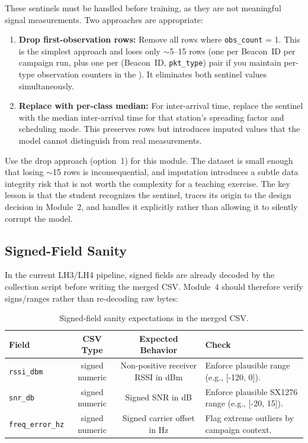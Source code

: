 \documentclass[11pt,letterpaper]{article}
\begin{document}
	These sentinels must be handled before training, as they are not meaningful signal measurements. Two approaches are appropriate:

	\begin{enumerate}[leftmargin=2em]
		\item \textbf{Drop first-observation rows:} Remove all rows where \texttt{obs\_count} = 1. This is the simplest approach and loses only $\sim$5--15 rows (one per Beacon~ID per campaign run, plus one per (Beacon~ID, \texttt{pkt\_type}) pair if you maintain per-type observation counters in the \FPGA{}). It eliminates both sentinel values simultaneously.
		\item \textbf{Replace with per-class median:} For inter-arrival time, replace the sentinel with the median inter-arrival time for that station's spreading factor and scheduling mode. This preserves rows but introduces imputed values that the model cannot distinguish from real measurements.
	\end{enumerate}

	\begin{tcolorbox}[infobox={Recommendation}]
		Use the drop approach (option~1) for this module. The dataset is small enough that losing $\sim$15 rows is inconsequential, and imputation introduces a subtle data integrity risk that is not worth the complexity for a teaching exercise. The key lesson is that the student recognizes the sentinel, traces its origin to the \FPGA{} design decision in Module~2, and handles it explicitly rather than allowing it to silently corrupt the model.
	\end{tcolorbox}

	\subsection{Signed-Field Sanity}

	In the current LH3/LH4 pipeline, signed fields are already decoded by the collection script before writing the merged CSV. Module~4 should therefore verify signs/ranges rather than re-decoding raw bytes:

	\begin{table}[ht!]
		\centering
		\caption{Signed-field sanity expectations in the merged CSV.}
		\label{tab:signed}
		\renewcommand{\arraystretch}{1.3}
		\begin{tabularx}{\textwidth}{l c c X}
			\toprule
			\textbf{Field} & \textbf{CSV Type} & \textbf{Expected Behavior} & \textbf{Check} \\
			\midrule
			\texttt{rssi\_dbm} & signed numeric & Non-positive receiver RSSI in dBm & Enforce plausible range (e.g., [-120, 0]). \\
			\texttt{snr\_db} & signed numeric & Signed SNR in dB & Enforce plausible SX1276 range (e.g., [-20, 15]). \\
			\texttt{freq\_error\_hz} & signed numeric & Signed carrier offset in Hz & Flag extreme outliers by campaign context. \\
			\bottomrule
		\end{tabularx}
	\end{table}
\end{document}
